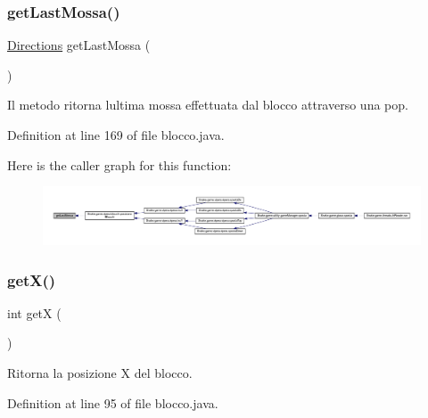 \subsubsection{\texorpdfstring{get\+Last\+Mossa()}{getLastMossa()}}
{\footnotesize\ttfamily \mbox{\hyperlink{enum_snake_1_1game_1_1utility_1_1_directions}{Directions}} get\+Last\+Mossa (\begin{DoxyParamCaption}{ }\end{DoxyParamCaption})}



Il metodo ritorna l\textquotesingle{}ultima mossa effettuata dal blocco attraverso una pop. 



Definition at line 169 of file blocco.\+java.

Here is the caller graph for this function\+:
\nopagebreak
\begin{figure}[H]
\begin{center}
\leavevmode
\includegraphics[width=350pt]{class_snake_1_1game_1_1vipera_1_1blocco_a95fdd903a87a54ceaba0674eee0a4dda_icgraph}
\end{center}
\end{figure}
\mbox{\label{class_snake_1_1game_1_1vipera_1_1blocco_ae13f88e922e1339355456062ad9fa359}} 
\subsubsection{\texorpdfstring{get\+X()}{getX()}}
{\footnotesize\ttfamily int getX (\begin{DoxyParamCaption}{ }\end{DoxyParamCaption})}



Ritorna la posizione X del blocco. 



Definition at line 95 of file blocco.\+java.

